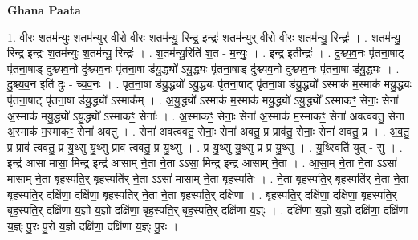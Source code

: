 \documentclass[17pt]{extarticle}
\begin{document}
\textbf{Ghana Paata } \newline

1. वी॒रः श॒तम॑न्युः श॒तम॑न्युर् वी॒रो वी॒रः श॒तम॑न्यु॒ रिन्द्र॒ इन्द्रः॑ श॒तम॑न्युर् वी॒रो वी॒रः श॒तम॑न्यु॒ रिन्द्रः॑ । . श॒तम॑न्यु॒ रिन्द्र॒ इन्द्रः॑ श॒तम॑न्युः श॒तम॑न्यु॒ रिन्द्रः॑ । . श॒तम॑न्यु॒रिति॑ श॒त - म॒न्युः॒ । . इन्द्र॒ इतीन्द्रः॑ । . दु॒श्च्य॒व॒नः पृ॑तना॒षाट् पृ॑तना॒षाड् दु॑श्च्यव॒नो दु॑श्च्यव॒नः पृ॑तना॒षा ड॑यु॒द्ध्यो॑ ऽयु॒द्ध्यः पृ॑तना॒षाड् दु॑श्च्यव॒नो दु॑श्च्यव॒नः पृ॑तना॒षा ड॑यु॒द्ध्यः । . दु॒श्च्य॒व॒न इति॑ दुः - च्य॒व॒नः । . पृ॒त॒ना॒षा ड॑यु॒द्ध्यो॑ ऽयु॒द्ध्यः पृ॑तना॒षाट् पृ॑तना॒षा ड॑यु॒द्ध्यो᳚ ऽस्माक॑ म॒स्माक॑ मयु॒द्ध्यः पृ॑तना॒षाट् पृ॑तना॒षा ड॑यु॒द्ध्यो᳚ ऽस्माक᳚म् । . अ॒यु॒द्ध्यो᳚ ऽस्माक॑ म॒स्माक॑ मयु॒द्ध्यो॑ ऽयु॒द्ध्यो᳚ ऽस्माकꣳ॒॒ सेनाः॒ सेना॑ अ॒स्माक॑ मयु॒द्ध्यो॑ ऽयु॒द्ध्यो᳚ ऽस्माकꣳ॒॒ सेनाः᳚ । . अ॒स्माकꣳ॒॒ सेनाः॒ सेना॑ अ॒स्माक॑ म॒स्माकꣳ॒॒ सेना॑ अवत्ववतु॒ सेना॑ अ॒स्माक॑ म॒स्माकꣳ॒॒ सेना॑ अवतु । . सेना॑ अवत्ववतु॒ सेनाः॒ सेना॑ अवतु॒ प्र प्राव॑तु॒ सेनाः॒ सेना॑ अवतु॒ प्र । . अ॒व॒तु॒ प्र प्राव॑ त्ववतु॒ प्र यु॒थ्सु यु॒थ्सु प्राव॑ त्ववतु॒ प्र यु॒थ्सु । . प्र यु॒थ्सु यु॒थ्सु प्र प्र यु॒थ्सु । . यु॒थ्स्विति॑ युत् - सु । . इन्द्र॑ आसा मासा॒ मिन्द्र॒ इन्द्र॑ आसाम् ने॒ता ने॒ता ऽऽसा॒ मिन्द्र॒ इन्द्र॑ आसाम् ने॒ता । . आ॒सा॒म् ने॒ता ने॒ता ऽऽसा॑ मासाम् ने॒ता बृह॒स्पति॒र् बृह॒स्पति॑र् ने॒ता ऽऽसा॑ मासाम् ने॒ता बृह॒स्पतिः॑ । . ने॒ता बृह॒स्पति॒र् बृह॒स्पति॑र् ने॒ता ने॒ता बृह॒स्पति॒र् दक्षि॑णा॒ दक्षि॑णा॒ बृह॒स्पति॑र् ने॒ता ने॒ता बृह॒स्पति॒र् दक्षि॑णा । . बृह॒स्पति॒र् दक्षि॑णा॒ दक्षि॑णा॒ बृह॒स्पति॒र् बृह॒स्पति॒र् दक्षि॑णा य॒ज्ञो य॒ज्ञो दक्षि॑णा॒ बृह॒स्पति॒र् बृह॒स्पति॒र् दक्षि॑णा य॒ज्ञ्ः । . दक्षि॑णा य॒ज्ञो य॒ज्ञो दक्षि॑णा॒ दक्षि॑णा य॒ज्ञ्ः पु॒रः पु॒रो य॒ज्ञो दक्षि॑णा॒ दक्षि॑णा य॒ज्ञ्ः पु॒रः । \newline
\end{document}
